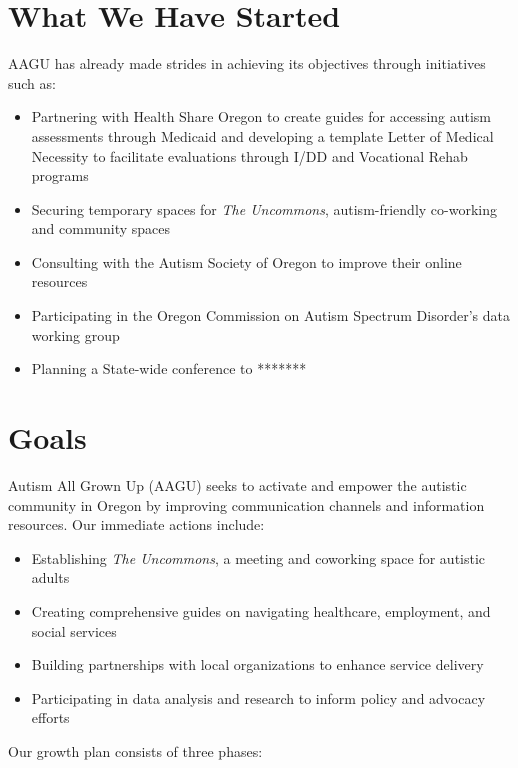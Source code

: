 \documentclass[
  letterpaper,
  DIV=11,
  numbers=noendperiod]{scrreprt}
\providecommand{\tightlist}{%
  \setlength{\itemsep}{0pt}\setlength{\parskip}{0pt}}\usepackage{longtable,booktabs,array}
\begin{document}
\section{What We Have Started}\label{sec-aagu_started}

AAGU has already made strides in achieving its objectives through
initiatives such as:

\begin{itemize}
\tightlist
\item
  Partnering with Health Share Oregon to create guides for accessing
  autism assessments through Medicaid and developing a template Letter
  of Medical Necessity to facilitate evaluations through I/DD and
  Vocational Rehab programs
\item
  Securing temporary spaces for \emph{The Uncommons}, autism-friendly
  co-working and community spaces
\item
  Consulting with the Autism Society of Oregon to improve their online
  resources
\item
  Participating in the Oregon Commission on Autism Spectrum Disorder's
  data working group
\item
  Planning a State-wide conference to *******
\end{itemize}

\section{Goals}\label{sec-aagu_goals}

Autism All Grown Up (AAGU) seeks to activate and empower the autistic
community in Oregon by improving communication channels and information
resources. Our immediate actions include:

\begin{itemize}
\tightlist
\item
  Establishing \emph{The Uncommons}, a meeting and coworking space for
  autistic adults
\item
  Creating comprehensive guides on navigating healthcare, employment,
  and social services
\item
  Building partnerships with local organizations to enhance service
  delivery
\item
  Participating in data analysis and research to inform policy and
  advocacy efforts
\end{itemize}

Our growth plan consists of three phases:
\end{document}
